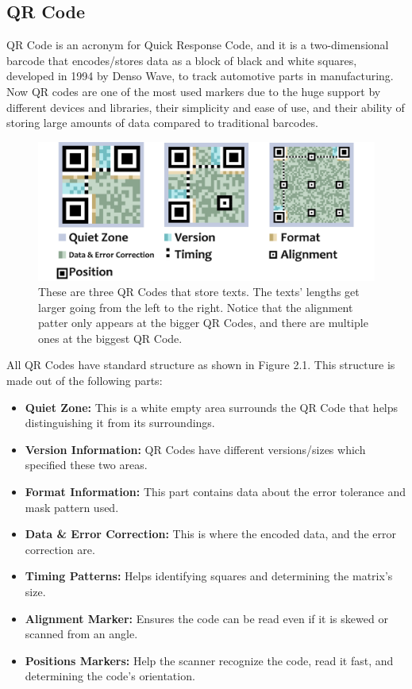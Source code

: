\subsection{QR Code}

QR Code is an acronym for Quick Response Code, and it is a two-dimensional barcode that encodes/stores data as a block of black and white squares, developed in 1994 by Denso Wave, to track automotive parts in manufacturing. Now QR codes are one of the most used markers due to the huge support by different devices and libraries, their simplicity and ease of use, and their ability of storing large amounts of data compared to traditional barcodes.

\begin{figure}[h]
\includegraphics[width=\textwidth]{assets/ch2/QR Codes Figure.png}
\caption{These are three QR Codes that store texts. The texts' lengths get larger going from the left to the right. Notice that the alignment patter only appears at the bigger QR Codes, and there are multiple ones at the biggest QR Code. }
\end{figure}

All QR Codes have standard structure as shown in Figure 2.1. This structure is made out of the following parts:

\begin{itemize}
	\item \textbf{Quiet Zone:} This is a white empty area surrounds the QR Code that helps distinguishing it from its surroundings.
	\item \textbf{Version Information:} QR Codes have different versions/sizes which specified these two areas.
	\item \textbf{Format Information:} This part contains data about the error tolerance and mask pattern used.
	\item \textbf{Data \& Error Correction:} This is where the encoded data, and the error correction are.
	\item \textbf{Timing Patterns:} Helps identifying squares and determining the matrix's size.
	\item \textbf{Alignment Marker:} Ensures the code can be read even if it is skewed or scanned from an angle.
	\item \textbf{Positions Markers:} Help the scanner recognize the code, read it fast, and determining the code's orientation.
\end{itemize}